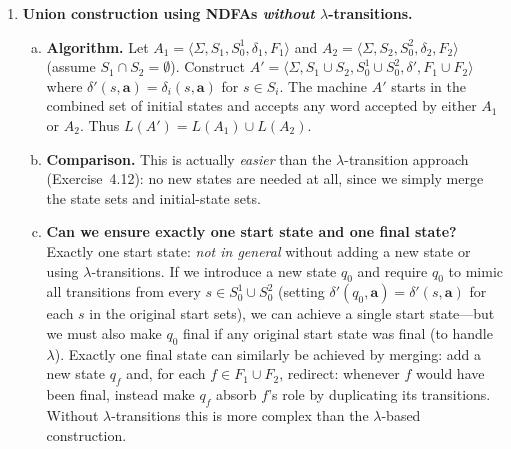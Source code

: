 \begin{enumerate}[{4.}1.]
\textbf{Example.}  Suppose $A_\lambda$ has start state $s_0$ with
$s_0\in F$ (so $\lambda\in L(A_\lambda)$) and transitions that extend the
language.  If we set $q_0=s_0$ without creating a separate new start state,
the $\lambda$-closure would ``spread'' acceptance to additional states in ways
that might incorrectly mark non-$\lambda$ prefixes as accepted.  The fresh
isolated $q_0$ cleanly separates the ``zero-length acceptance'' case from the
rest of the computation.

\item \textbf{Union construction using NDFAs \emph{without} $\lambda$-transitions.}

\begin{enumerate}[(a)]
  \item \textbf{Algorithm.}  Let $A_1=\langle\Sigma,S_1,S^1_0,\delta_1,F_1\rangle$
  and $A_2=\langle\Sigma,S_2,S^2_0,\delta_2,F_2\rangle$ (assume $S_1\cap S_2=\emptyset$).
  Construct $A'=\langle\Sigma,S_1\cup S_2,S^1_0\cup S^2_0,\delta',F_1\cup F_2\rangle$
  where $\delta'(s,\pmb{a})=\delta_i(s,\pmb{a})$ for $s\in S_i$.
  The machine $A'$ starts in the combined set of initial states and accepts
  any word accepted by either $A_1$ or $A_2$.  Thus $L(A')=L(A_1)\cup L(A_2)$.

  \item \textbf{Comparison.}  This is actually \emph{easier} than the
  $\lambda$-transition approach (Exercise~4.12): no new states are needed at
  all, since we simply merge the state sets and initial-state sets.

  \item \textbf{Can we ensure exactly one start state and one final state?}
  Exactly one start state: \emph{not in general} without adding a new
  state or using $\lambda$-transitions.  If we introduce a new state $q_0$
  and require $q_0$ to mimic all transitions from every $s\in S^1_0\cup S^2_0$
  (setting $\delta'(q_0,\pmb{a})=\delta'(s,\pmb{a})$ for each $s$ in the
  original start sets), we can achieve a single start state---but we must also
  make $q_0$ final if any original start state was final (to handle $\lambda$).
  Exactly one final state can similarly be achieved by merging: add a new
  state $q_f$ and, for each $f\in F_1\cup F_2$, redirect: whenever $f$ would
  have been final, instead make $q_f$ absorb $f$'s role by duplicating its
  transitions.  Without $\lambda$-transitions this is more complex than
  the $\lambda$-based construction.
\end{enumerate}


\end{enumerate}

